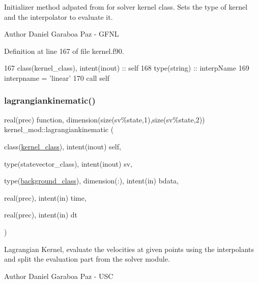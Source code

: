 Initializer method adpated from for solver kernel class. Sets the type of kernel and the interpolator to evaluate it. 

\begin{DoxyAuthor}{Author}
Daniel Garaboa Paz -\/ G\+F\+NL 
\end{DoxyAuthor}


Definition at line 167 of file kernel.\+f90.


\begin{DoxyCode}
167     \textcolor{keywordtype}{class}(kernel\_class), \textcolor{keywordtype}{intent(inout)} :: self
168     \textcolor{keywordtype}{type}(string) :: interpName
169     interpname = \textcolor{stringliteral}{'linear'}
170     \textcolor{keyword}{call }self%
\end{DoxyCode}
\mbox{\label{namespacekernel__mod_aec47ab247a9afc2a7fdc272620b3c5e8}} 
\subsubsection{\texorpdfstring{lagrangiankinematic()}{lagrangiankinematic()}}
{\footnotesize\ttfamily real(prec) function, dimension(size(sv\%state,1),size(sv\%state,2)) kernel\+\_\+mod\+::lagrangiankinematic (\begin{DoxyParamCaption}\item[{class(\mbox{\hyperlink{structkernel__mod_1_1kernel__class}{kernel\+\_\+class}}), intent(inout)}]{self,  }\item[{type(statevector\+\_\+class), intent(inout)}]{sv,  }\item[{type(\mbox{\hyperlink{structbackground__mod_1_1background__class}{background\+\_\+class}}), dimension(\+:), intent(in)}]{bdata,  }\item[{real(prec), intent(in)}]{time,  }\item[{real(prec), intent(in)}]{dt }\end{DoxyParamCaption})}



Lagrangian Kernel, evaluate the velocities at given points using the interpolants and split the evaluation part from the solver module. 

\begin{DoxyAuthor}{Author}
Daniel Garaboa Paz -\/ U\+SC 
\end{DoxyAuthor}

